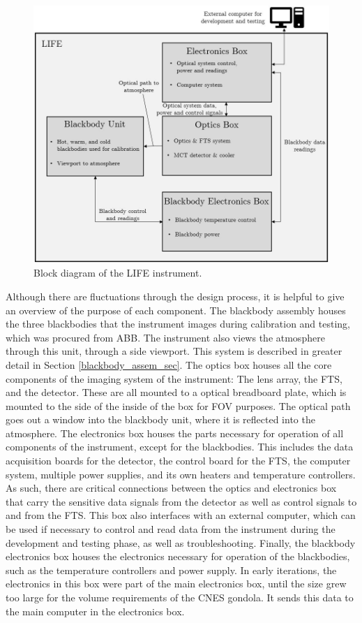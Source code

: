 \begin{figure}
    \centering
    \includegraphics[width=\linewidth]{chap3_images/LIFE_block_diagram.JPG}
    \caption{Block diagram of the LIFE instrument.}
    \label{fig:LIFE_block_diagram}
\end{figure}

Although there are fluctuations through the design process, it is helpful to give an overview of the purpose of each component. The blackbody assembly houses the three blackbodies that the instrument images during calibration and testing, which was procured from ABB. The instrument also views the atmosphere through this unit, through a side viewport. This system is described in greater detail in Section \ref{blackbody_assem_sec}. The optics box houses all the core components of the imaging system of the instrument: The lens array, the FTS, and the detector. These are all mounted to a optical breadboard plate, which is mounted to the side of the inside of the box for FOV purposes. The optical path goes out a window into the blackbody unit, where it is reflected into the atmosphere. The electronics box houses the parts necessary for operation of all components of the instrument, except for the blackbodies. This includes the data acquisition boards for the detector, the control board for the FTS, the computer system, multiple power supplies, and its own heaters and temperature controllers. As such, there are critical connections between the optics and electronics box that carry the sensitive data signals from the detector as well as control signals to and from the FTS. This box also interfaces with an external computer, which can be used if necessary to control and read data from the instrument during the development and testing phase, as well as troubleshooting. Finally, the blackbody electronics box houses the electronics necessary for operation of the blackbodies, such as the temperature controllers and power supply. In early iterations, the electronics in this box were part of the main electronics box, until the size grew too large for the volume requirements of the CNES gondola. It sends this data to the main computer in the electronics box.

